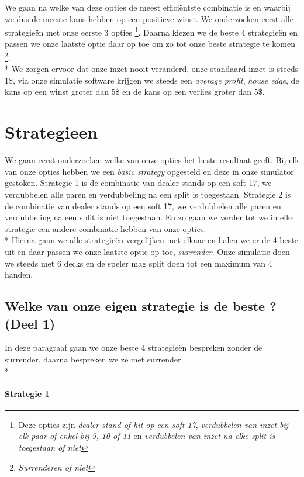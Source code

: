 \documentclass[conference]{IEEEtran}
\begin{document}
We gaan na welke van deze opties de meest effici\"entste combinatie is en waarbij we dus de meeste kans hebben op een positieve winst.
We onderzoeken eerst alle strategie\"en met onze eerste 3 opties
	\footnote{ Deze opties zijn {\it dealer stand of hit op een soft 17}, {\it verdubbelen van inzet bij elk paar of enkel bij 9, 10 of 11} en {\it verdubbelen van inzet na elke split is toegestaan of niet}}. 
Daarna kiezen we de beste 4 strategie\"en en passen we onze laatste optie daar op toe om zo tot onze beste strategie te komen 
	\footnote{{\it Surrenderen of niet}}. \\*
We zorgen ervoor dat onze inzet nooit veranderd, onze standaard inzet is steeds 1\$, via onze simulatie software krijgen we steeds een \textit{average profit}, \textit{house edge}, de kans op een winst groter dan 5\$ en de kans op een verlies groter dan 5\$. 

\newpage

\section{Strategieen}
We gaan eerst onderzoeken welke van onze opties het beste resultaat geeft. Bij elk van onze opties hebben we een \textit{basic strategy}
opgesteld en deze in onze simulator gestoken. Strategie 1 is de combinatie van dealer stands op een soft 17, we verdubbelen alle paren en
verdubbeling na een split is toegestaan. Strategie 2 is de combinatie van dealer stands op een soft 17, we verdubbelen alle paren en
verdubbeling na een split is niet toegestaan. En zo gaan we verder tot we in elke strategie een andere combinatie hebben van onze opties.\\*
Hierna gaan we alle strategie\"en vergelijken met elkaar en halen we er de 4 beste uit en daar passen we onze laatste optie op toe, \textit{surrender}. Onze simulatie doen we steeds met 6 decks en de speler mag split doen tot een maximum van 4 handen.

\subsection{Welke van onze eigen strategie is de beste ? (Deel 1)}
In deze paragraaf gaan we onze beste 4 strategie\"en bespreken zonder de surrender, daarna bespreken we ze met surrender.\\*


\paragraph{Strategie 1}
\end{document}
